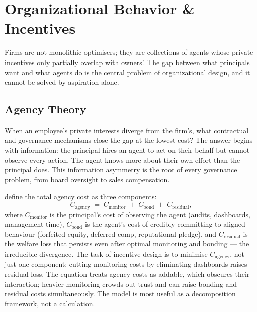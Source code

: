 \chapter{Organizational Behavior \& Incentives}\label{ch:organizational-behavior}


Firms are not monolithic optimisers; they are collections of agents whose private incentives only partially overlap with owners'. The gap between what principals want and what agents do is the central problem of organizational design, and it cannot be solved by aspiration alone.

\section{Agency Theory}\label{sec:agency-theory}

When an employee's private interests diverge from the firm's, what contractual and governance mechanisms close the gap at the lowest cost? The answer begins with information: the principal hires an agent to act on their behalf but cannot observe every action. The agent knows more about their own effort than the principal does. This information asymmetry is the root of every governance problem, from board oversight to sales compensation.

\textcite{jensen1976agency} define the total agency cost as three components:
\begin{equation}\label{eq:agency-cost}
  C_{\text{agency}} \;=\; C_{\text{monitor}} \;+\; C_{\text{bond}} \;+\; C_{\text{residual}},
\end{equation}
where \(C_{\text{monitor}}\) is the principal's cost of observing the agent (audits, dashboards, management time), \(C_{\text{bond}}\) is the agent's cost of credibly committing to aligned behaviour (forfeited equity, deferred comp, reputational pledge), and \(C_{\text{residual}}\) is the welfare loss that persists even after optimal monitoring and bonding --- the irreducible divergence. The task of incentive design is to minimise \(C_{\text{agency}}\), not just one component: cutting monitoring costs by eliminating dashboards raises residual loss. The equation treats agency costs as addable, which obscures their interaction; heavier monitoring crowds out trust and can raise bonding and residual costs simultaneously. The model is most useful as a decomposition framework, not a calculation.

